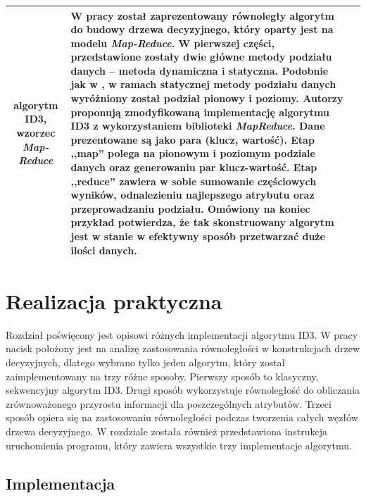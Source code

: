 \documentclass[12pt]{article}
\begin{document}
\begin{center}
\begin{longtable}{| c | p{} | p{} |}
            algorytm ID3, wzorzec \textit{Map-Reduce} &

            W pracy został zaprezentowany równoległy algorytm do budowy drzewa decyzyjnego, 
            który oparty jest na modelu \textit{Map-Reduce}. W pierwszej części, przedstawione zostały dwie główne metody podziału
            danych -- metoda dynamiczna i statyczna. Podobnie jak w \cite{parallel-implementation-decision-tree}, w ramach
            statycznej metody podziału danych wyróżniony został podział pionowy i poziomy. 
            Autorzy proponują zmodyfikowaną implementację algorytmu ID3 z wykorzystaniem biblioteki \textit{MapReduce}.
            Dane prezentowane są jako para (klucz, wartość). Etap ,,map'' polega na pionowym i poziomym podziale danych oraz generowaniu par klucz-wartość.
            Etap ,,reduce'' zawiera w sobie sumowanie częściowych wyników, odnalezieniu najlepszego atrybutu oraz
            przeprowadzaniu podziału. Omówiony na koniec przykład potwierdza, że tak skonstruowany algorytm jest w stanie
            w efektywny sposób przetwarzać duże ilości danych.\\

            \hline
 
        \end{longtable}

    \end{center}
\newpage

\section{Realizacja praktyczna}

Rozdział poświęcony jest opisowi różnych implementacji algorytmu ID3. W pracy nacisk położony jest na analizę
zastosowania równoległości w konstrukcjach drzew decyzyjnych, dlatego wybrano tylko jeden algorytm, który został
zaimplementowany na trzy różne sposoby. Pierwszy sposób to klasyczny, sekwencyjny algorytm ID3. Drugi sposób
wykorzystuje równoległość do obliczania zrównoważonego przyrostu informacji dla poszczególnych atrybutów.
Trzeci sposób opiera się na zastosowaniu równoległości podczas tworzenia całych węzłów drzewa decyzyjnego.
W rozdziale została również przedstawiona instrukcja uruchomienia programu, który zawiera wszystkie trzy
implementacje algorytmu.

\subsection{Implementacja}
\end{document}
